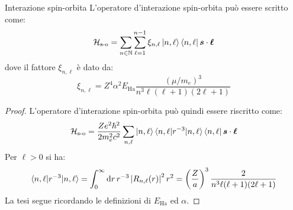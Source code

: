 \begin{proposition}{Interazione spin-orbita}{}
	L'operatore d'interazione spin-orbita può essere scritto come:
	\begin{equation}
		\mathcal{H}_\text{s-o} = \sum_{n \in \mathbb{N}} \sum_{\ell = 1}^{n - 1} \xi_{n,\ell} \ket{n,\ell} \bra{n,\ell} \boldsymbol{s} \cdot \boldsymbol{\ell}
	\end{equation}
	dove il fattore $ \xi_{n,\ell} $ è dato da:
	\begin{equation}
		\xi_{n,\ell} = Z^4 \alpha^2 E_\text{Ha} \frac{(\mu / m_e)^3}{n^3 \ell (\ell + 1) (2\ell + 1)}
		\label{eq:1-e-int-spin-orb}
	\end{equation}

	\tcblower

	\begin{proof}
		L'operatore d'interazione spin-orbita può quindi essere riscritto come:
		\begin{equation*}
			\mathcal{H}_\text{s-o} = \frac{Ze^2\hbar^2}{2m_e^2c^2} \sum_{n,\ell} \ket{n,\ell} \braket{n,\ell | r^{-3} | n,\ell} \bra{n,\ell} \boldsymbol{s} \cdot \boldsymbol{\ell}
		\end{equation*}
		Per $ \ell > 0 $ si ha:
		\begin{equation*}
			\braket{n,\ell | r^{-3} | n,\ell} = \int_0^\infty \mathrm{d} r\, r^{-3} \left\lvert R_{n,\ell}(r)\right\rvert^2 r^2 = \left( \frac{Z}{a} \right)^3 \frac{2}{n^3 \ell (\ell + 1) (2\ell + 1)}
		\end{equation*}
		La tesi segue ricordando le definizioni di $ E_\text{Ha} $ ed $ \alpha $.
	\end{proof}
\end{proposition}

